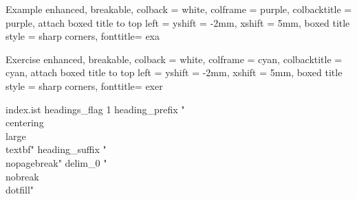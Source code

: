 {Example}%
  {
    enhanced, breakable,
    colback = white, colframe = purple, colbacktitle = purple,
    attach boxed title to top left = {yshift = -2mm, xshift = 5mm},
    boxed title style = {sharp corners},
    fonttitle=\sffamily\small
  }
{exa}


{Exercise}%
  {
    enhanced, breakable,
    colback = white, colframe = cyan, colbacktitle = cyan,
    attach boxed title to top left = {yshift = -2mm, xshift = 5mm},
    boxed title style = {sharp corners},
    fonttitle=\sffamily\small
  }
{exer}

\makeatletter
\renewcommand\theHtcb@cnt@exercise{\thechapter.\arabic{tcb@cnt@exercise}}
\makeatother



\usepackage{changepage}
\newenvironment{remark}{\underline{\textbf{Remark.}}}{\par}

\newenvironment{solve}[1][\color{blue}\bf Solve]{\begin{trivlist}
  \item[\hskip \labelsep {\color{blue}\bfseries
  #1}]}{\hfill$\Box$\end{trivlist}}
   \makeatother

\newenvironment{proofsolution}
    {\renewcommand\qedsymbol{$\square$}\color{blue}\begin{adjustwidth}{0em}{2em}\begin{proof}[\textit Proof.~]}
    {\end{proof}\end{adjustwidth}}


\begin{filecontents}{index.ist}
headings_flag 1
heading_prefix "{\\centering\\large \\textbf{"
heading_suffix "}}\\nopagebreak\n"
delim_0 "\\nobreak\\dotfill"
\end{filecontents}
\newcommand{\myindex}[1]{\index{#1} \emph{#1}}
\makeindex[columns=3, intoc, title=Alphabetical Index, options= -s index.ist]

